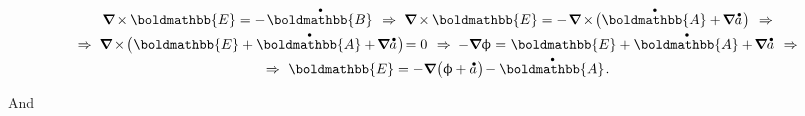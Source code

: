 \nopagebreak\begin{multline}
\boldnabla \hspace{-0.15ex} \times \hspace{-0.1ex} \boldmathbb{E} = - \hspace{.2ex} \mathdotabove{\boldmathbb{B}}
\hspace{.4em} \Rightarrow \hspace{.3em}
\boldnabla \hspace{-0.15ex} \times \hspace{-0.1ex} \boldmathbb{E} = - \hspace{.2ex} \boldnabla \hspace{-0.15ex} \times \hspace{-0.3ex} \bigl( \mathdotabove{\boldmathbb{A}} + \hspace{-0.2ex} \boldnabla \mathdotabove{a} \hspace{.15ex} \bigr)
\hspace{.4em} \Rightarrow
\\[-0.1em]
\Rightarrow \hspace{.3em}
\boldnabla \hspace{-0.15ex} \times \hspace{-0.3ex} \bigl( \hspace{.1ex} \boldmathbb{E} + \mathdotabove{\boldmathbb{A}} + \hspace{-0.2ex} \boldnabla \mathdotabove{a} \hspace{.15ex} \bigr) \hspace{-0.4ex} = 0
\hspace{.4em} \Rightarrow \hspace{.25em}
- \boldnabla \upphi = \hspace{.1ex} \boldmathbb{E} + \mathdotabove{\boldmathbb{A}} + \hspace{-0.2ex} \boldnabla \mathdotabove{a}
\hspace{.4em} \Rightarrow
\\[-0.1em]
\Rightarrow \hspace{.33em}
\boldmathbb{E} = - \boldnabla \hspace{.1ex} \bigl( \upphi \hspace{-0.1ex} + \mathdotabove{a} \hspace{.1ex} \bigr) \hspace{-0.3ex} - \mathdotabove{\boldmathbb{A}}
\hspace{.2ex} .
\end{multline}

And

